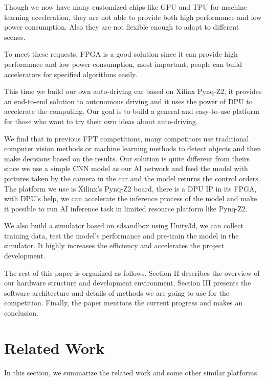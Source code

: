 \documentclass[conference]{IEEEtran}
\begin{document}
Though we now have many customized chips like GPU\cite{b1} and TPU\cite{b2} for machine learning acceleration, they are not able to provide both high performance and low power consumption. Also they are not flexible enough to adapt to different scenes. 

To meet these requests, FPGA\cite{b3} is a good solution since it can provide high performance and low power consumption, most important, people can build accelerators for specified algorithms easily.

This time we build our own auto-driving car based on Xilinx Pynq-Z2\cite{b4}, it provides an end-to-end solution to autonomous driving and it uses the power of DPU\cite{b5} to accelerate the computing. Our goal is to build a general and easy-to-use platform for those who want to try their own ideas about auto-driving.

We find that in previous FPT competitions\cite{b6}, many competitors use traditional computer vision methods or machine learning methods to detect objects and then make decisions based on the results\cite{b7}\cite{b8}. Our solution is quite different from theirs since we use a simple CNN model as our AI network and feed the model with pictures taken by the camera in the car and the model returns the control orders.
The platform we use is Xilinx’s Pynq-Z2 board, there is a DPU IP in its FPGA, with DPU’s help, we can accelerate the inference process of the model and make it possible to run AI inference task in limited resource platform like Pynq-Z2. 

We also build a simulator based on sdsandbox\cite{b9} using Unity3d\cite{b10}, we can collect training data, test the model's performance and pre-train the model in the simulator. It highly increases the efficiency and accelerates the project development. 

The rest of this paper is organized as follows. Section II describes the overview of our hardware structure and development environment. Section III presents the software architecture and details of methods we are going to use for the competition. Finally, the paper mentions the current progress and makes an conclusion.

\section{Related Work}

In this section, we summarize the related work and some other similar platforms.
\end{document}
